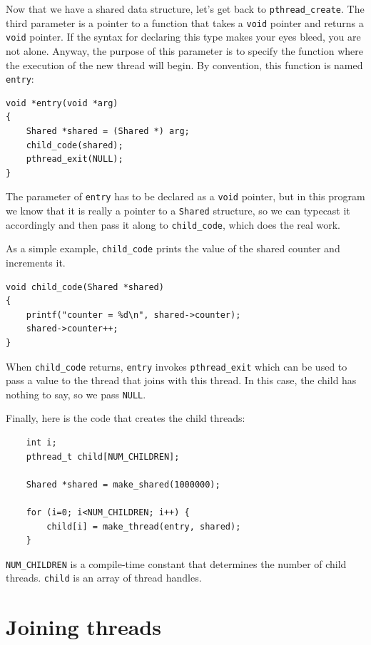 \documentclass[12pt]{book}
\begin{document}
Now that we have a shared data structure, let's get back to
{\tt pthread\_create}.
The third parameter is a pointer to a function that takes
a {\tt void} pointer and returns a {\tt void} pointer.  If the syntax
for declaring this type makes your eyes bleed, you are not alone.
Anyway, the purpose of this parameter is to specify the function where
the execution of the new thread will begin.  By convention, this
function is named {\tt entry}:

\begin{verbatim}
void *entry(void *arg)
{
    Shared *shared = (Shared *) arg;
    child_code(shared);
    pthread_exit(NULL);
}
\end{verbatim}

The parameter of {\tt entry} has to be declared as a {\tt void}
pointer, but in this program we know that it is really a pointer to a
{\tt Shared} structure, so we can typecast it accordingly and then
pass it along to {\tt child\_code}, which does the real work.

As a simple example, \verb"child_code" prints the value of
the shared counter and increments it.

\begin{verbatim}
void child_code(Shared *shared)
{  
    printf("counter = %d\n", shared->counter);
    shared->counter++;
}
\end{verbatim}

When {\tt child\_code} returns, {\tt entry} invokes
\verb"pthread_exit" which can be used to pass a value to the thread
that joins with this thread.  In this case, the child has nothing to
say, so we pass {\tt NULL}.

Finally, here is the code that creates the child threads:

\begin{verbatim}
    int i;
    pthread_t child[NUM_CHILDREN];

    Shared *shared = make_shared(1000000);

    for (i=0; i<NUM_CHILDREN; i++) {
        child[i] = make_thread(entry, shared);
    }
\end{verbatim}

\verb"NUM_CHILDREN" is a compile-time constant that determines
the number of child threads.  {\tt child} is an array of
thread handles.


\section{Joining threads}
\end{document}

